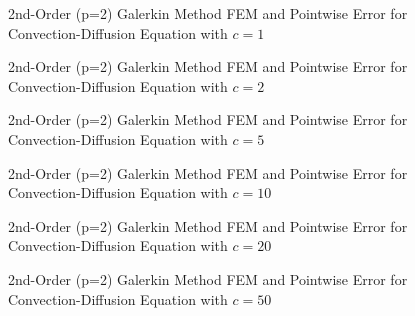 \documentclass[10pt]{article}		%
\numberwithin{equation}{section}
\begin{document}
\begin{figure}[H]
	\begin{center}
		\caption{2nd-Order (p=2) Galerkin Method FEM and Pointwise Error for Convection-Diffusion Equation with $c = 1$}
	\end{center}
\end{figure}

\begin{figure}[H]
	\begin{center}
		\caption{2nd-Order (p=2) Galerkin Method FEM and Pointwise Error for Convection-Diffusion Equation with $c = 2$}
	\end{center}
\end{figure}

\begin{figure}[H]
	\begin{center}
		\caption{2nd-Order (p=2) Galerkin Method FEM and Pointwise Error for Convection-Diffusion Equation with $c = 5$}
	\end{center}
\end{figure}

\newpage

\begin{figure}[H]
	\begin{center}
		\caption{2nd-Order (p=2) Galerkin Method FEM and Pointwise Error for Convection-Diffusion Equation with $c = 10$}
	\end{center}
\end{figure}

\begin{figure}[H]
	\begin{center}
		\caption{2nd-Order (p=2) Galerkin Method FEM and Pointwise Error for Convection-Diffusion Equation with $c = 20$}
	\end{center}
\end{figure}

\begin{figure}[H]
	\begin{center}
		\caption{2nd-Order (p=2) Galerkin Method FEM and Pointwise Error for Convection-Diffusion Equation with $c = 50$}
	\end{center}
\end{figure}
\end{document}
